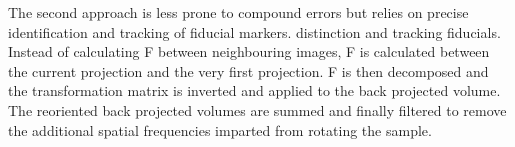 \documentclass{osa-article}
\begin{document}
%

The second approach is less prone to compound errors but relies on precise identification and tracking of fiducial markers.
distinction and tracking fiducials.
Instead of calculating \gls*{F} between neighbouring images, \gls*{F} is calculated between the current projection and the very first projection.
\gls*{F} is then decomposed and the transformation matrix is inverted and applied to the back projected volume.
The reoriented back projected volumes are summed and finally filtered to remove the additional spatial frequencies imparted from rotating the sample.

\end{document}

